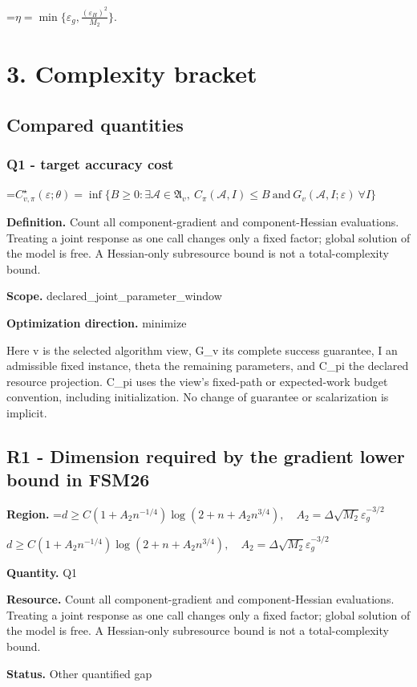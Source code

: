 \documentclass[10pt,a4paper]{article}
\newcommand{\AtlasMath}[1]{\par\begingroup\centering\setbox0=\hbox{$\displaystyle #1$}\ifdim\wd0>1.4\linewidth\typeout{ATLAS WIDE FORMULA: \the\wd0}\fi\ifdim\wd0>\linewidth\resizebox{\linewidth}{!}{\box0}\else\box0\fi\par\endgroup}
\newcommand{\AtlasInlineMath}[1]{\begingroup\setbox0=\hbox{$#1$}\ifdim\wd0>.4\linewidth\endgroup\AtlasMath{#1}\else\endgroup$#1$\fi}
\begin{document}
\AtlasMath{\eta=\min\{\varepsilon_g,\frac{(\varepsilon_H)^{2}}{M_2}\}.}


\section{3. Complexity bracket}
\subsection{Compared quantities}
\subsubsection{Q1 - target accuracy cost}
\AtlasMath{C^\star_{v,\pi}(\varepsilon;\theta)=\inf\{B\ge0:\exists\mathcal A\in\mathfrak A_v,\ C_\pi(\mathcal A,I)\le B\ \text{and}\ G_v(\mathcal A,I;\varepsilon)\ \forall I\}}
\textbf{Definition.} Count all component-gradient and component-Hessian evaluations. Treating a joint response as one call changes only a fixed factor; global solution of the model is free. A Hessian-only subresource bound is not a total-complexity bound.

\textbf{Scope.} declared\_joint\_parameter\_window

\textbf{Optimization direction.} minimize

Here v is the selected algorithm view, G\_v its complete success guarantee, I an admissible fixed instance, theta the remaining parameters, and C\_pi the declared resource projection. C\_pi uses the view's fixed-path or expected-work budget convention, including initialization. No change of guarantee or scalarization is implicit.

\subsection{R1 - Dimension required by the gradient lower bound in FSM26}
\textbf{Region.} \AtlasInlineMath{d\ge C(1+A_2n^{-1/4})\log(2+n+A_2n^{3/4}),\quad A_2=\Delta\sqrt{M_2}\varepsilon_g^{-3/2}}

\textbf{Quantity.} Q1

\textbf{Resource.} Count all component-gradient and component-Hessian evaluations. Treating a joint response as one call changes only a fixed factor; global solution of the model is free. A Hessian-only subresource bound is not a total-complexity bound.

\textbf{Status.} Other quantified gap
\end{document}
